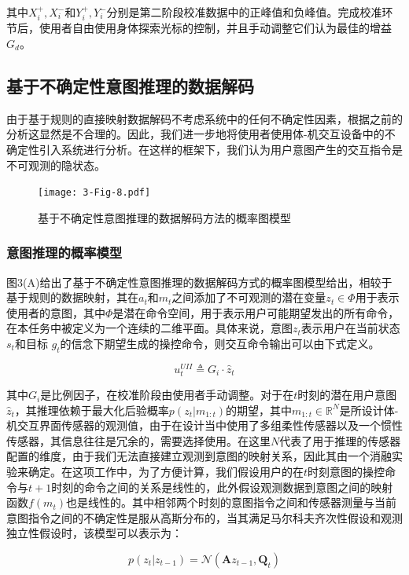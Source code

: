 其中$X_i^ + ,X_i^ - $和$Y_i^ + ,Y_i^ - $分别是第二阶段校准数据中的正峰值和负峰值。完成校准环节后，使用者自由使用身体探索光标的控制，并且手动调整它们认为最佳的增益$G_d$。 

\subsection{基于不确定性意图推理的数据解码}由于基于规则的直接映射数据解码不考虑系统中的任何不确定性因素，根据之前的分析这显然是不合理的。因此，我们进一步地将使用者使用体-机交互设备中的不确定性引入系统进行分析。在这样的框架下，我们认为用户意图产生的交互指令是不可观测的隐状态。

\begin{figure}[!t]
    \centering
    \texttt{[image: 3-Fig-8.pdf]}
    \caption{基于不确定性意图推理的数据解码方法的概率图模型}
    \label{3-fig-6}
\end{figure} 

\subsubsection{意图推理的概率模型}
图3(A)给出了基于不确定性意图推理的数据解码方式的概率图模型给出，相较于基于规则的数据映射，其在${a_t}$和${m_t}$之间添加了不可观测的潜在变量${z_t} \in \Phi $用于表示使用者的意图，其中$\Phi$是潜在命令空间，用于表示用户可能期望发出的所有命令，在本任务中被定义为一个连续的二维平面。具体来说，意图${z_t}$表示用户在当前状态${s_t}$和目标 ${g_t}$的信念下期望生成的操控命令，则交互命令输出可以由下式定义。

\begin{equation}
\label{eq3}
u_t^{UII} \triangleq {G_i} \cdot {\hat z_t}
\end{equation}    

其中$G_i$是比例因子，在校准阶段由使用者手动调整。对于在$t$时刻的潜在用户意图${\hat z_t}$，其推理依赖于最大化后验概率$p({z_t}|{m_{1:t}})$的期望，其中$m_{1:t} \in {\mathbb{R}^{N}}$是所设计体-机交互界面传感器的观测值，由于在设计当中使用了多组柔性传感器以及一个惯性传感器，其信息往往是冗余的，需要选择使用。在这里$N$代表了用于推理的传感器配置的维度，由于我们无法直接建立观测到意图的映射关系，因此其由一个消融实验来确定。在这项工作中，为了方便计算，我们假设用户的在$t$时刻意图的操控命令与$t+1$时刻的命令之间的关系是线性的，此外假设观测数据到意图之间的映射函数$f(m_t)$也是线性的。其中相邻两个时刻的意图指令之间和传感器测量与当前意图指令之间的不确定性是服从高斯分布的，当其满足马尔科夫齐次性假设和观测独立性假设时，该模型可以表示为：

\begin{equation}
\label{eq4}
p({z_t}|{z_{t - 1}}) = \mathcal{N}({\boldsymbol{A}}{z_{t - 1}},{{\boldsymbol{Q}}_t})
\end{equation}   

